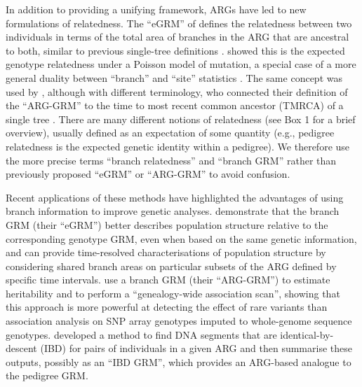 In addition to providing a unifying framework,
ARGs have led to new formulations of relatedness.
%
The ``eGRM'' of \citet{fan2022genealogical}
defines the relatedness between two individuals
in terms of the total area of branches in the ARG that are ancestral to both,
similar to previous single-tree definitions \citep{slatkin1991inbreeding}.
%
\citet{fan2022genealogical} showed this is the expected genotype relatedness
under a Poisson model of mutation,
a special case of a more general duality between ``branch''
and ``site'' statistics \citep{ralph2019empirical, ralph2020efficiently}.
%
The same concept was used by \citet{zhang2023biobank},
although with different terminology,
who connected their definition of the ``ARG-GRM'' to
the time to most recent common ancestor (TMRCA)
of a single tree \citep{slatkin1991inbreeding, mcvean2009genealogical}.
%
There are many different notions of relatedness (see Box 1 for a 
brief overview), usually defined as an expectation of some 
quantity (e.g., pedigree relatedness is the expected genetic identity within a pedigree).
We therefore use the more precise terms 
``branch relatedness'' and ``branch GRM'' 
rather than previously proposed ``eGRM'' or ``ARG-GRM'' 
to avoid confusion.

Recent applications of these methods have highlighted the advantages of
using branch information to improve genetic analyses.
%
\citet{fan2022genealogical} demonstrate that the branch GRM (their ``eGRM'')
better describes population structure relative to the corresponding genotype GRM,
even when based on the same genetic information,
and can provide time-resolved characterisations of population structure
by considering shared branch areas on particular subsets of the ARG
defined by specific time intervals.
%
\citet{zhang2023biobank} use a branch GRM (their ``ARG-GRM'')
to estimate heritability and to perform a ``genealogy-wide association scan'',
showing that this approach is more powerful at detecting the effect of rare variants
than association analysis on SNP array genotypes imputed to whole-genome sequence genotypes.
%
\citet{tsambos2022efficient} developed a method
to find DNA segments that are identical-by-descent (IBD) for pairs of individuals in a given ARG and
then summarise these outputs, possibly as an ``IBD GRM'',
which provides an ARG-based analogue to the pedigree GRM.

